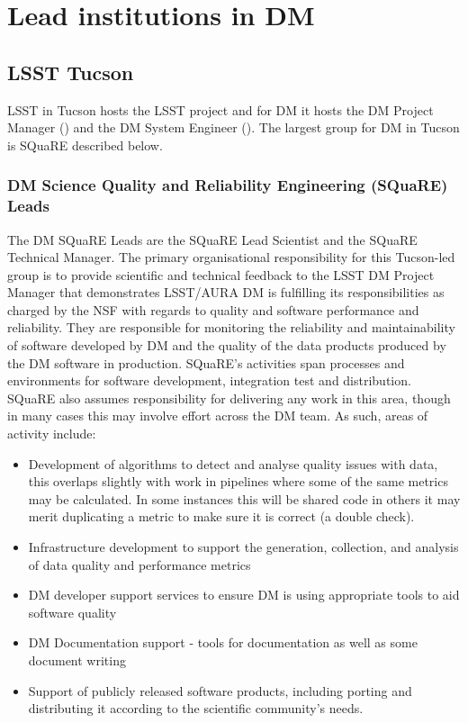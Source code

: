 \section {Lead institutions in DM } \label{sect:leadtutes}
\subsection {LSST Tucson}\label{sect:tucson}
LSST in Tucson hosts the LSST project and for DM it hosts the DM Project Manager () and the DM System Engineer (). The largest group for DM in Tucson is SQuaRE described below.

\subsubsection{DM Science Quality and Reliability Engineering (SQuaRE) Leads \label{sect:square}}
The DM SQuaRE Leads are the SQuaRE Lead Scientist and the SQuaRE Technical Manager.  The primary organisational responsibility for this Tucson-led group is to provide scientific and technical feedback to the LSST DM Project Manager that demonstrates LSST/AURA DM is fulfilling its responsibilities as charged by the NSF with regards to quality and software performance and reliability.
They are responsible for monitoring the reliability and maintainability of software developed by DM and the quality of the data products produced by the DM software in production. SQuaRE's activities span processes and environments for software development, integration test and distribution.  SQuaRE also assumes responsibility for delivering any work in this area, though in many cases this may involve effort across the DM team.
As such, areas of activity include:
\begin{itemize}
	\item Development of algorithms to detect and analyse quality issues with data, this overlaps slightly with work in pipelines where some of the same metrics may be calculated. In some instances this will be shared code in others it may merit duplicating a metric to make sure it is correct (a double check).
	\item Infrastructure development to support the generation, collection, and analysis of data quality and performance metrics
	\item DM developer support services to ensure DM is using appropriate tools to aid software quality
	
	\item DM Documentation support - tools for documentation as well as some document writing
	\item Support of publicly released software products, including porting and distributing it according to the scientific community's needs.
\end{itemize}

